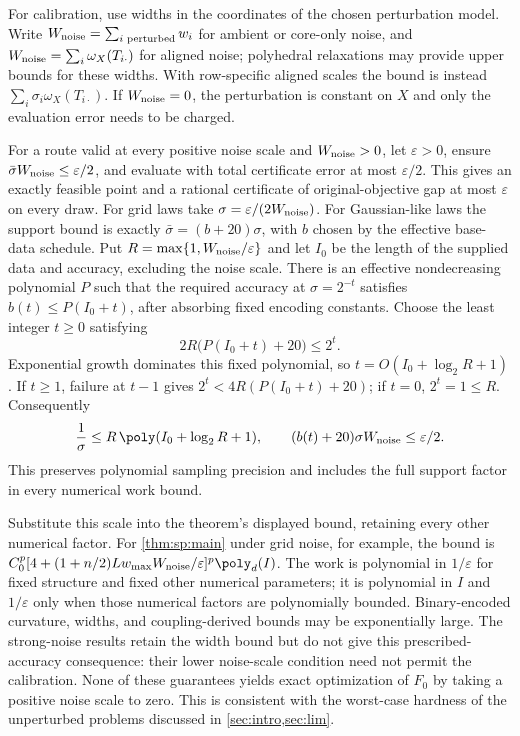 For calibration, use widths in the coordinates of the chosen perturbation
model. Write $W_{\rm noise}=\sum_{i\text{ perturbed}}w_i$ for ambient or
core-only noise, and $W_{\rm noise}=\sum_i\omega_X(T_{i\cdot})$ for aligned
noise; polyhedral relaxations may provide upper bounds for these widths.
With row-specific aligned scales the bound is instead
$\sum_i\sigma_i\omega_X(T_{i\cdot})$. If $W_{\rm noise}=0$, the perturbation
is constant on $X$ and only the evaluation error needs to be charged.

For a route valid at every positive noise scale and $W_{\rm noise}>0$, let
$\varepsilon>0$, ensure $\bar\sigma W_{\rm noise}\le\varepsilon/2$, and
evaluate with total certificate error at most $\varepsilon/2$. This gives an
exactly feasible point and a rational certificate of original-objective gap
at most $\varepsilon$ on every draw. For grid laws take
$\sigma=\varepsilon/(2W_{\rm noise})$.
For Gaussian-like laws the support bound is exactly
$\bar\sigma=(b+20)\sigma$, with $b$ chosen by the effective base-data
schedule. Put $R=\max\{1,W_{\rm noise}/\varepsilon\}$ and let $I_0$ be the
length of the supplied data and accuracy, excluding the noise scale. There
is an effective nondecreasing polynomial $P$ such that the required accuracy
at $\sigma=2^{-t}$ satisfies $b(t)\le P(I_0+t)$, after absorbing fixed
encoding constants. Choose the least integer $t\ge0$ satisfying
\[
 2R\bigl(P(I_0+t)+20\bigr)\le2^t .
\]
Exponential growth dominates this fixed polynomial, so
$t=O(I_0+\log_2R+1)$. If $t\ge1$, failure at $t-1$ gives
$2^t<4R(P(I_0+t)+20)$; if $t=0$, $2^t=1\le R$. Consequently
\[
 \frac1\sigma\le R\,\poly(I_0+\log_2R+1),\qquad
 (b(t)+20)\sigma W_{\rm noise}\le\varepsilon/2 .
\]
This preserves polynomial sampling precision and includes the full support
factor in every numerical work bound.

Substitute this scale into the theorem's displayed bound, retaining every
other numerical factor. For \cref{thm:sp:main} under grid noise, for example,
the bound is
$C_0^p[4+(1+n/2)Lw_{\max}W_{\rm noise}/\varepsilon]^p\poly_d(I)$.
The work is polynomial in $1/\varepsilon$ for fixed structure and fixed
other numerical parameters; it is polynomial in $I$ and $1/\varepsilon$
only when those numerical factors are polynomially bounded. Binary-encoded
curvature, widths, and coupling-derived bounds may be exponentially large.
The strong-noise results retain the width bound but do not give this
prescribed-accuracy consequence: their lower noise-scale condition need not
permit the calibration. None of these guarantees yields exact optimization
of $F_0$ by taking a positive noise scale to zero.
This is consistent with the worst-case hardness of the unperturbed problems
discussed in \cref{sec:intro,sec:lim}.

